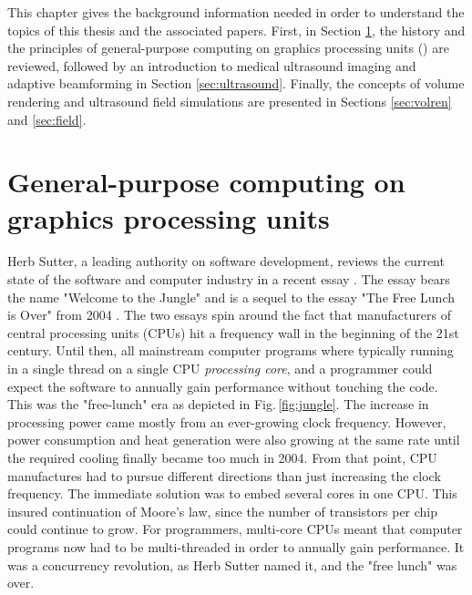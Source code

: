 %

This chapter gives the background information needed in order to understand the topics of this thesis and the associated papers. First, in Section \ref{sec:gpgpu}, the history and the principles of general-purpose computing on graphics processing units () are reviewed, followed by an introduction to medical ultrasound imaging and adaptive beamforming in Section \ref{sec:ultrasound}. Finally, the concepts of volume rendering and ultrasound field simulations are presented in Sections \ref{sec:volren} and \ref{sec:field}.

\section{General-purpose computing on graphics processing units}\label{sec:gpgpu}
Herb Sutter, a leading authority on software development, reviews the current state of the software and computer industry in a recent essay \cite{HerbSutter}. The essay bears the name "Welcome to the Jungle" and is a sequel to the essay "The Free Lunch is Over" from 2004 \cite{HerbSuttera}. The two essays spin around the fact that manufacturers of central processing units (CPUs) hit a frequency wall in the beginning of the 21st century. Until then, all mainstream computer programs where typically running in a single thread on a single CPU \textit{processing core}, and a programmer could expect the software to annually gain performance without touching the code. This was the "free-lunch" era as depicted in Fig.\,\ref{fig:jungle}. The increase in processing power came mostly from an ever-growing clock frequency. However, power consumption and heat generation were also growing at the same rate until the required cooling finally became too much in 2004.  From that point, CPU manufactures had to pursue different directions than just increasing the clock frequency. The immediate solution was to embed several cores in one CPU. This insured continuation of Moore's law, since the number of transistors per chip could continue to grow. For programmers, multi-core CPUs meant that computer programs now had to be multi-threaded in order to annually gain performance. It was a concurrency revolution, as Herb Sutter named it, and  the "free lunch" was over.

